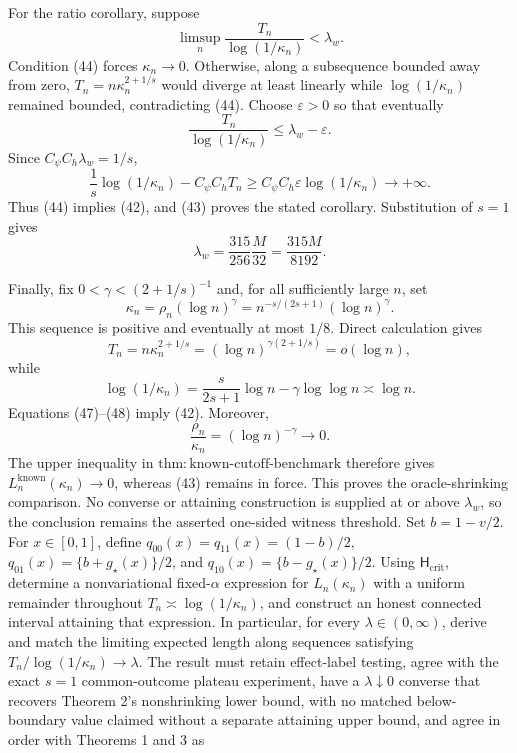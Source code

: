 For the ratio corollary, suppose
\[
\limsup_n\frac{T_n}{\log(1/\kappa_n)}<\lambda_w.
\tag{44}
\]
Condition (44) forces \(\kappa_n\to0\).  Otherwise, along a subsequence bounded away from zero, \(T_n=n\kappa_n^{2+1/s}\) would diverge at least linearly while \(\log(1/\kappa_n)\) remained bounded, contradicting (44).  Choose \(\varepsilon>0\) so that eventually
\[
\frac{T_n}{\log(1/\kappa_n)}\le\lambda_w-\varepsilon.
\]
Since \(C_\psi C_h\lambda_w=1/s\),
\[
\frac1s\log(1/\kappa_n)-C_\psi C_hT_n
\ge C_\psi C_h\varepsilon\log(1/\kappa_n)
\longrightarrow+\infty.
\tag{45}
\]
Thus (44) implies (42), and (43) proves the stated corollary.  Substitution of \(s=1\) gives
\[
\lambda_w=\frac{315}{256}\frac{M}{32}=\frac{315M}{8192}.
\]

Finally, fix \(0<\gamma<(2+1/s)^{-1}\) and, for all sufficiently large \(n\), set
\[
\kappa_n=\rho_n(\log n)^\gamma
=n^{-s/(2s+1)}(\log n)^\gamma.
\tag{46}
\]
This sequence is positive and eventually at most \(1/8\).  Direct calculation gives
\[
T_n=n\kappa_n^{2+1/s}
=(\log n)^{\gamma(2+1/s)}=o(\log n),
\tag{47}
\]
while
\[
\log(1/\kappa_n)
=\frac{s}{2s+1}\log n-\gamma\log\log n
\asymp\log n.
\tag{48}
\]
Equations (47)--(48) imply (42).  Moreover,
\[
\frac{\rho_n}{\kappa_n}=(\log n)^{-\gamma}\longrightarrow0.
\]
The upper inequality in \(\mathrm{thm:known\mbox{-}cutoff\mbox{-}benchmark}\) therefore gives \(L_n^{\mathrm{known}}(\kappa_n)\to0\), whereas (43) remains in force.  This proves the oracle-shrinking comparison.  No converse or attaining construction is supplied at or above \(\lambda_w\), so the conclusion remains the asserted one-sided witness threshold.
Set \(b=1-v/2\).  For \(x\in[0,1]\), define \(q_{00}(x)=q_{11}(x)=(1-b)/2\), \(q_{01}(x)=\{b+g_\star(x)\}/2\), and \(q_{10}(x)=\{b-g_\star(x)\}/2\).
Using \(\mathsf H_{\mathrm{crit}}\), determine a nonvariational
fixed-\(\alpha\) expression for \(L_n(\kappa_n)\) with a uniform
remainder throughout \(T_n\asymp\log(1/\kappa_n)\), and construct an
honest connected interval attaining that expression.  In particular,
for every \(\lambda\in(0,\infty)\), derive and match the limiting
expected length along sequences satisfying
\(T_n/\log(1/\kappa_n)\to\lambda\).  The result must retain
effect-label testing, agree with the exact \(s=1\) common-outcome
plateau experiment, have a \(\lambda\downarrow0\) converse that
recovers Theorem 2's nonshrinking lower bound, with no matched
below-boundary value claimed without a separate attaining upper bound,
and agree in order with Theorems 1 and 3 as

